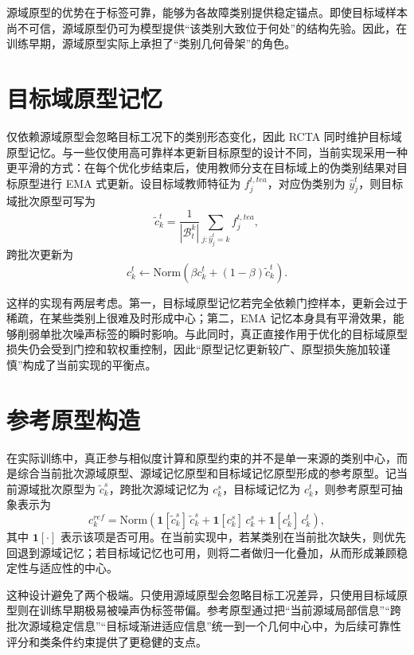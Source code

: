 源域原型的优势在于标签可靠，能够为各故障类别提供稳定锚点。即使目标域样本尚不可信，源域原型仍可为模型提供“该类别大致位于何处”的结构先验。因此，在训练早期，源域原型实际上承担了“类别几何骨架”的角色。

\section{目标域原型记忆}
仅依赖源域原型会忽略目标工况下的类别形态变化，因此 RCTA 同时维护目标域原型记忆。与一些仅使用高可靠样本更新目标原型的设计不同，当前实现采用一种更平滑的方式：在每个优化步结束后，使用教师分支在目标域上的伪类别结果对目标原型进行 EMA 式更新。设目标域教师特征为 $f_j^{t,tea}$，对应伪类别为 $\hat{y}_j^t$，则目标域批次原型可写为
\begin{equation}
\tilde{c}_{k}^{t}=
\frac{1}{|\mathcal{B}_{t}^{k}|}
\sum_{j:\hat{y}_j^t=k} f_j^{t,tea},
\end{equation}
跨批次更新为
\begin{equation}
c_{k}^{t}\leftarrow
\mathrm{Norm}\!\left(
\beta c_k^t+(1-\beta)\tilde{c}_k^t
\right).
\end{equation}

这样的实现有两层考虑。第一，目标域原型记忆若完全依赖门控样本，更新会过于稀疏，在某些类别上很难及时形成中心；第二，EMA 记忆本身具有平滑效果，能够削弱单批次噪声标签的瞬时影响。与此同时，真正直接作用于优化的目标域原型损失仍会受到门控和软权重控制，因此“原型记忆更新较广、原型损失施加较谨慎”构成了当前实现的平衡点。

\section{参考原型构造}
在实际训练中，真正参与相似度计算和原型约束的并不是单一来源的类别中心，而是综合当前批次源域原型、源域记忆原型和目标域记忆原型形成的参考原型。记当前源域批次原型为 $\tilde{c}_{k}^{s}$，跨批次源域记忆为 $c_k^s$，目标域记忆为 $c_k^t$，则参考原型可抽象表示为
\begin{equation}
c_k^{ref}=
\mathrm{Norm}\!\left(
\mathbf{1}[\tilde{c}_{k}^{s}]\,\tilde{c}_{k}^{s}
+\mathbf{1}[c_k^s]\,c_k^s
+\mathbf{1}[c_k^t]\,c_k^t
\right),
\end{equation}
其中 $\mathbf{1}[\cdot]$ 表示该项是否可用。在当前实现中，若某类别在当前批次缺失，则优先回退到源域记忆；若目标域记忆也可用，则将二者做归一化叠加，从而形成兼顾稳定性与适应性的中心。

这种设计避免了两个极端。只使用源域原型会忽略目标工况差异，只使用目标域原型则在训练早期极易被噪声伪标签带偏。参考原型通过把“当前源域局部信息”“跨批次源域稳定信息”“目标域渐进适应信息”统一到一个几何中心中，为后续可靠性评分和类条件约束提供了更稳健的支点。

